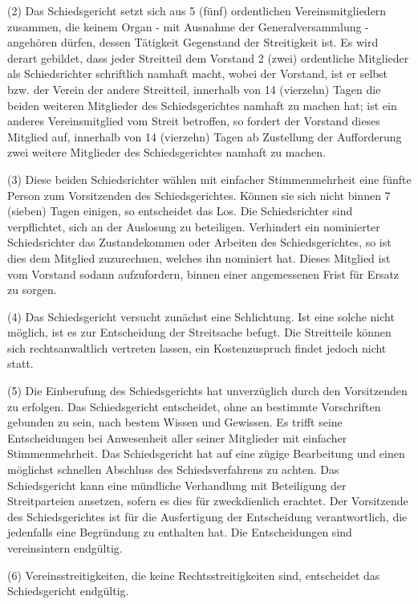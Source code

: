 \documentclass[11pt,a4paper]{article}
\begin{document}
(2)
Das Schiedsgericht setzt sich aus 5 (fünf) ordentlichen Vereinsmitgliedern zusammen, die keinem Organ - mit Ausnahme der Generalversammlung - angehören dürfen, dessen Tätigkeit Gegenstand der Streitigkeit ist.
Es wird derart gebildet, dass jeder Streitteil dem Vorstand 2 (zwei) ordentliche Mitglieder als Schiedsrichter schriftlich namhaft macht, wobei der Vorstand, ist er selbst bzw. der Verein der andere Streitteil, innerhalb von 14 (vierzehn) Tagen die beiden weiteren Mitglieder des Schiedsgerichtes namhaft zu machen hat; ist ein anderes Vereinsmitglied vom Streit betroffen, so fordert der Vorstand dieses Mitglied auf, innerhalb von 14 (vierzehn) Tagen ab Zustellung der Aufforderung zwei weitere Mitglieder des Schiedsgerichtes namhaft zu machen.

(3)
Diese beiden Schiedsrichter wählen mit einfacher Stimmenmehrheit eine fünfte Person zum Vorsitzenden des Schiedsgerichtes.
Können sie sich nicht binnen 7 (sieben) Tagen einigen, so entscheidet das Los.
Die Schiedsrichter sind verpflichtet, sich an der Auslosung zu beteiligen.
Verhindert ein nominierter Schiedsrichter das Zustandekommen oder Arbeiten des Schiedsgerichtes, so ist dies dem Mitglied zuzurechnen, welches ihn nominiert hat.
Dieses Mitglied ist vom Vorstand sodann aufzufordern, binnen einer angemessenen Frist für Ersatz zu sorgen.

(4)
Das Schiedsgericht versucht zunächst eine Schlichtung.
Ist eine solche nicht möglich, ist es zur Entscheidung der Streitsache befugt.
Die Streitteile können sich rechtsanwaltlich vertreten lassen, ein Kostenzuspruch findet jedoch nicht statt.

(5)
Die Einberufung des Schiedsgerichts hat unverzüglich durch den Vorsitzenden zu erfolgen.
Das Schiedsgericht entscheidet, ohne an bestimmte Vorschriften gebunden zu sein, nach bestem Wissen und Gewissen.
Es trifft seine Entscheidungen bei Anwesenheit aller seiner Mitglieder mit einfacher Stimmenmehrheit.
Das Schiedsgericht hat auf eine zügige Bearbeitung und einen möglichst schnellen Abschluss des Schiedsverfahrens zu achten.
Das Schiedsgericht kann eine mündliche Verhandlung mit Beteiligung der Streitparteien ansetzen, sofern es dies für zweckdienlich erachtet.
Der Vorsitzende des Schiedsgerichtes ist für die Ausfertigung der Entscheidung verantwortlich, die jedenfalls eine Begründung zu enthalten hat.
Die Entscheidungen sind vereinsintern endgültig.

(6)
Vereinsstreitigkeiten, die keine Rechtsstreitigkeiten sind, entscheidet das Schiedsgericht endgültig.
\end{document}
